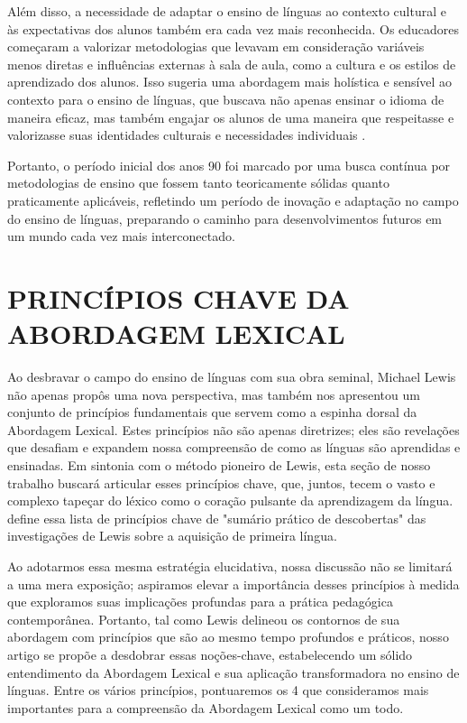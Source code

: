 Além disso, a necessidade de adaptar o ensino de línguas ao contexto cultural e às expectativas dos alunos também era cada vez mais reconhecida. Os educadores começaram a valorizar metodologias que levavam em consideração variáveis menos diretas e influências externas à sala de aula, como a cultura e os estilos de aprendizado dos alunos. Isso sugeria uma abordagem mais holística e sensível ao contexto para o ensino de línguas, que buscava não apenas ensinar o idioma de maneira eficaz, mas também engajar os alunos de uma maneira que respeitasse e valorizasse suas identidades culturais e necessidades individuais .

Portanto, o período inicial dos anos 90 foi marcado por uma busca contínua por metodologias de ensino que fossem tanto teoricamente sólidas quanto praticamente aplicáveis, refletindo um período de inovação e adaptação no campo do ensino de línguas, preparando o caminho para desenvolvimentos futuros em um mundo cada vez mais interconectado.

\section{PRINCÍPIOS CHAVE DA ABORDAGEM LEXICAL}

Ao desbravar o campo do ensino de línguas com sua obra seminal, Michael Lewis não apenas propôs uma nova perspectiva, mas também nos apresentou um conjunto de princípios fundamentais que servem como a espinha dorsal da Abordagem Lexical. Estes princípios não são apenas diretrizes; eles são revelações que desafiam e expandem nossa compreensão de como as línguas são aprendidas e ensinadas. Em sintonia com o método pioneiro de Lewis, esta seção de nosso trabalho buscará articular esses princípios chave, que, juntos, tecem o vasto e complexo tapeçar do léxico como o coração pulsante da aprendizagem da língua.  define essa lista de princípios chave de "sumário prático de descobertas" das investigações de Lewis sobre a aquisição de primeira língua.

Ao adotarmos essa mesma estratégia elucidativa, nossa discussão não se limitará a uma mera exposição; aspiramos elevar a importância desses princípios à medida que exploramos suas implicações profundas para a prática pedagógica contemporânea. Portanto, tal como Lewis delineou os contornos de sua abordagem com princípios que são ao mesmo tempo profundos e práticos, nosso artigo se propõe a desdobrar essas noções-chave, estabelecendo um sólido entendimento da Abordagem Lexical e sua aplicação transformadora no ensino de línguas. Entre os vários princípios, pontuaremos os 4 que consideramos mais importantes para a compreensão da Abordagem Lexical como um todo.

